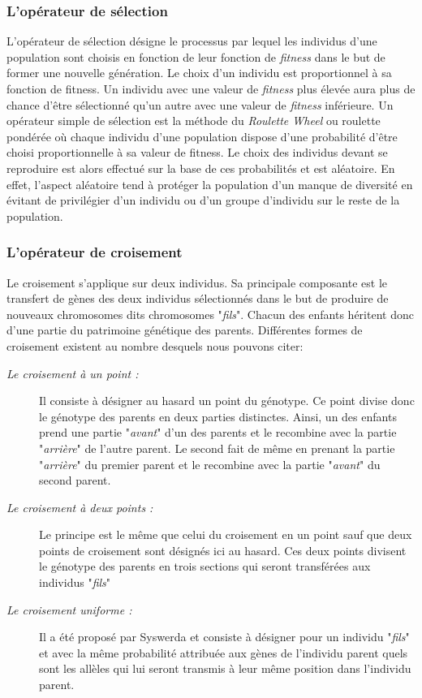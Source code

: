 		\subsubsection{L’opérateur de sélection}
		L'opérateur de sélection désigne le processus par lequel les individus d'une population sont choisis en fonction de leur fonction de \emph{fitness} dans le but de former une nouvelle génération. Le choix d'un individu est proportionnel à sa fonction de fitness. Un individu avec une valeur de \emph{fitness} plus élevée aura plus de chance d’être sélectionné qu’un autre avec une valeur de \emph{fitness} inférieure. Un opérateur simple de sélection est la méthode du \emph{Roulette Wheel} ou roulette pondérée où chaque individu d’une population dispose d'une probabilité d'être choisi proportionnelle à sa valeur de fitness. Le choix des individus devant se reproduire est alors effectué sur la base de ces probabilités et est aléatoire. En effet, l'aspect aléatoire tend à protéger la population d'un manque de diversité en évitant de privilégier d'un individu ou d'un groupe d'individu sur le reste de la population.
		
	\subsubsection{L’opérateur de croisement}
	Le croisement s'applique sur deux individus. Sa principale composante est le transfert de gènes des deux individus sélectionnés dans le but de produire de nouveaux chromosomes dits chromosomes "\emph{fils}". Chacun des enfants héritent donc d'une partie du patrimoine génétique des parents. Différentes formes de croisement existent au nombre desquels nous pouvons citer:
	\begin{description}
		\item[\textsl{Le croisement à un point :}] Il consiste à désigner au hasard un point du génotype. Ce point divise donc le génotype des parents en deux parties distinctes. Ainsi, un des enfants prend une partie "\emph{avant}" d'un des parents et le recombine avec la partie "\emph{arrière}" de l'autre parent. Le second fait de même en prenant la partie "\emph{arrière}" du premier parent et le recombine avec la partie "\emph{avant}" du second parent.
		
		\item[\textsl{Le croisement à deux points :}] Le principe est le même que celui du croisement en un point sauf que deux points de croisement sont désignés ici au hasard. Ces deux points divisent le génotype des parents en trois sections qui seront transférées aux individus "\emph{fils}"
	
		\item[\textsl{Le croisement uniforme :}] Il a été proposé par Syswerda \cite{Syswerda} et consiste à désigner pour un individu "\emph{fils}" et avec la même probabilité attribuée aux gènes de l'individu parent quels sont les allèles qui lui seront transmis à leur même position dans l'individu parent.
	
	\end{description}
	
